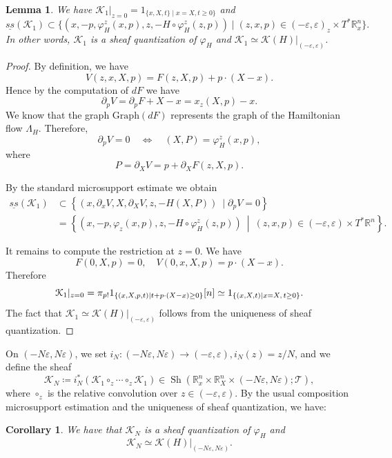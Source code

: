\documentclass[11pt]{amsart}
\numberwithin{equation}{section}
\theoremstyle{plain}
\newtheorem{Lemma}[lemma]{Lemma}
\newtheorem{Coro}[coro]{Corollary}
\theoremstyle{definition}
\theoremstyle{remark}
\newcommand{\bR} { {\mathbb{R}}}
\newcommand{\cK} { {\mathcal{K}}}
\newcommand{\sT} { {\mathscr{T}}}
\newcommand{\Sh} { {\operatorname{Sh}}}
\begin{document}
\begin{Lemma}We have $\cK_1|_{z=0}=1_{\{x,X,t\}\mid x=X,t\geq 0\}}$ and \[\underline{ss}(\cK_1)\subset \{(x,-p,\varphi_H^z(x,p),z,-H \circ \varphi_H^z(z,p))\mid (z,x,p)\in (-\varepsilon,\varepsilon)_z\times T^*\bR^n_x\}.\] 
In other words, $\cK_1$ is a sheaf quantization of $\varphi_H$ and $\cK_1 \simeq \cK(H)|_{(-\varepsilon, \varepsilon)}$.
\end{Lemma}
\begin{proof}
By definition, we have
\[
V(z,x,X,p)
=
F(z,X,p)+p\cdot(X-x).
\]
Hence by the computation of $dF$ we have
\[
\partial_pV
=
\partial_pF+X-x
=
x_z(X,p)-x.
\]
We know that the graph $\mathrm{Graph}(dF)$ represents the graph of the Hamiltonian flow $\Lambda_H$. Therefore,
\[
\partial_p V=0
\quad\Longleftrightarrow\quad
(X,P)=\varphi_H^z(x,p),
\]
where
\[
P=\partial_XV =p+\partial_XF(z,X,p).
\]

By the standard microsupport estimate \cite[Proposition 5.4.4]{KS90} we obtain
\begin{align*}
    \underline{ss}(\cK_1)
&\subset
\left\{
(x,\partial_x V, X,\partial_X V,z,-H(X,P))
\ \mid \partial_p V=0
\right\}\\
&= \left\{
(x,-p,\varphi_z(x,p),z,-H \circ \varphi_H^z(z,p))
\ \middle|\
(z,x,p)\in
(-\varepsilon,\varepsilon)\times T^*\bR^n
\right\}.
\end{align*}


It remains to compute the restriction at $z=0$. We have
\[
F(0,X,p)=0,\quad V(0,x,X,p)
=
p\cdot (X-x ).
\]
Therefore
\[
\cK_1|_{z=0}
=
\pi_{p!}
1_{\{(x,X,p,t)\mid
t+ p\cdot(X-x)\geq0\}}[n]\simeq
1_{\{(x,X,t)\mid x=X,\, t\geq0\}}.\qedhere
\]
The fact that $\cK_1 \simeq \cK(H)|_{(-\varepsilon,\varepsilon)}$ follows from the uniqueness of sheaf quantization.
\end{proof}

On $(-N\varepsilon,N\varepsilon)$, we set $i_N:(-N\varepsilon,N\varepsilon) \to (-\varepsilon,\varepsilon), i_N(z)=z/N$, and we define the sheaf 
\[\cK_N\coloneqq i_{N}^*(\cK_1\circ_{z} \cdots \circ_z\cK_1 ) \in \Sh(\bR^n_x\times \bR^n_X\times (-N\varepsilon,N\varepsilon);\sT),\]
where $\circ_z$ is the relative convolution over $z\in (-\varepsilon,\varepsilon)$.
By the usual composition microsupport estimation and the uniqueness of sheaf quantization, we have:

\begin{Coro}
We have that $\cK_N$ is a sheaf quantization of $\varphi_H$ and
\[\cK_N\simeq \cK(H)|_{(-N\varepsilon,N\varepsilon)}.\]
\end{Coro}
\end{document}
